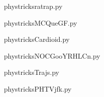 
    \newcommand{\CaptionFigratrap}{<+Type your caption here+>}
    \begin{center}
        
    \end{center}
    phystricksratrap.py

    

    \clearpage
    


    \newcommand{\CaptionFigMCQueGF}{<+Type your caption here+>}
    \begin{center}
        
    \end{center}
    phystricksMCQueGF.py

    

    \clearpage
    


    \newcommand{\CaptionFigCardioid}{<+Type your caption here+>}
    \begin{center}
        
    \end{center}
    phystricksCardioid.py

    

    \clearpage
    


    \newcommand{\CaptionFigNOCGooYRHLCn}{<+Type your caption here+>}
    \begin{center}
        
    \end{center}
    phystricksNOCGooYRHLCn.py

    

    \clearpage
    


    \newcommand{\CaptionFigTrajs}{<+Type your caption here+>}
    \begin{center}
        
    \end{center}
    phystricksTrajs.py

    

    \clearpage
    


    \newcommand{\CaptionFigPHTVjfk}{<+Type your caption here+>}
    \begin{center}
        
    \end{center}
    phystricksPHTVjfk.py

